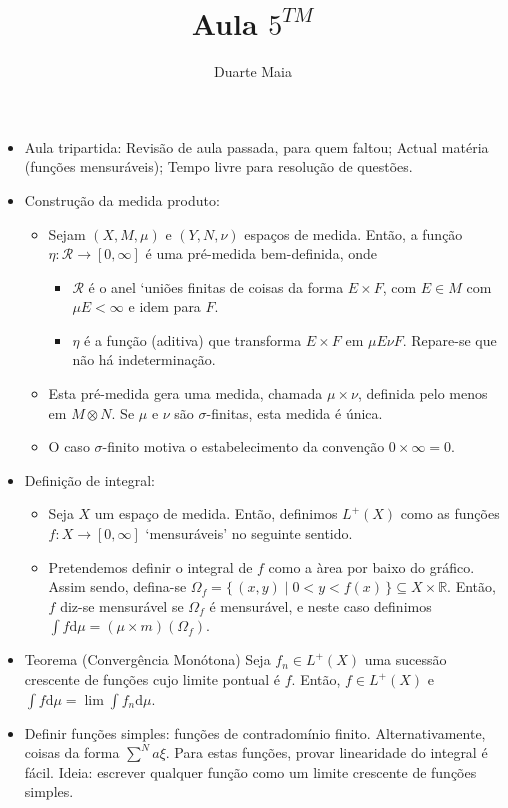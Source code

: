 \documentclass{article}
\title{Aula $5^{TM}$}
\author{Duarte Maia}
\date{}
\newcommand{\R}{\mathbb{R}}
\newcommand{\dd}{\mathrm{d}}
\begin{document}
\maketitle

\begin{itemize}
\item Aula tripartida: Revisão de aula passada, para quem faltou; Actual matéria (funções mensuráveis); Tempo livre para resolução de questões.
\item Construção da medida produto:
\begin{itemize}
\item Sejam $(X,M,\mu)$ e $(Y,N,\nu)$ espaços de medida. Então, a função $\eta : \mathcal R \to [0,\infty]$ é uma pré-medida bem-definida, onde
\begin{itemize}
\item $\mathcal R$ é o anel `uniões finitas de coisas da forma $E \times F$, com $E \in M$ com $\mu E < \infty$ e idem para $F$.
\item $\eta$ é a função (aditiva) que transforma $E \times F$ em $\mu E \nu F$. Repare-se que não há indeterminação.
\end{itemize}
\item Esta pré-medida gera uma medida, chamada $\mu \times \nu$, definida pelo menos em $M \otimes N$. Se $\mu$ e $\nu$ são $\sigma$-finitas, esta medida é única.
\item O caso $\sigma$-finito motiva o estabelecimento da convenção $0 \times \infty = 0$.
\end{itemize}
\item Definição de integral:
\begin{itemize}
\item Seja $X$ um espaço de medida. Então, definimos $L^+(X)$ como as funções $f : X \to [0,\infty]$ `mensuráveis' no seguinte sentido.
\item Pretendemos definir o integral de $f$ como a àrea por baixo do gráfico. Assim sendo, defina-se $\Omega_f = \{\,(x,y) \mid 0<y<f(x)\,\} \subseteq X \times \R$. Então, $f$ diz-se mensurável se $\Omega_f$ é mensurável, e neste caso definimos $\int f \dd \mu = (\mu \times m)(\Omega_f)$.
\end{itemize}
\item Teorema (Convergência Monótona) Seja $f_n \in L^+(X)$ uma sucessão crescente de funções cujo limite pontual é $f$. Então, $f \in L^+(X)$ e $\int f \dd \mu = \lim \int f_n \dd \mu$.
\item Definir funções simples: funções de contradomínio finito. Alternativamente, coisas da forma $\sum^N a \xi$. Para estas funções, provar linearidade do integral é fácil. Ideia: escrever qualquer função como um limite crescente de funções simples.

\end{itemize}
\end{document}
